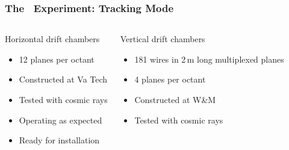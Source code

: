 \begin{frame}
 \frametitle{The \Qweak\ Experiment: Tracking Mode}
 \begin{columns}[T]
   \begin{block}{Horizontal drift chambers}
    \begin{itemize}
     \item 12 planes per octant
     \item Constructed at Va Tech
    \end{itemize}
    \centerline{}
    \begin{itemize}
     \item Tested with cosmic rays
     \item Operating as expected
     \item Ready for installation
    \end{itemize}
   \end{block}
   \begin{block}{Vertical drift chambers}
    \begin{itemize}
     \item 181 wires in 2\,m long multiplexed planes
     \item 4 planes per octant
     \item Constructed at W\&M
     \item Tested with cosmic rays
    \end{itemize}
    \centerline{}
   \end{block}
 \end{columns}
\end{frame}
